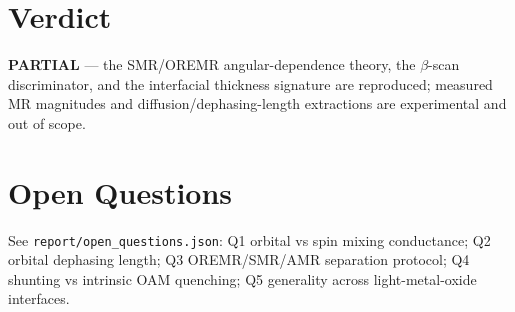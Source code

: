 \documentclass[11pt]{article}
\begin{document}
\section{Verdict}
\textbf{PARTIAL} --- the SMR/OREMR angular-dependence theory, the $\beta$-scan discriminator, and the
interfacial thickness signature are reproduced; measured MR magnitudes and diffusion/dephasing-length
extractions are experimental and out of scope.

\section*{Open Questions}
See \texttt{report/open\_questions.json}: Q1 orbital vs spin mixing conductance; Q2 orbital dephasing
length; Q3 OREMR/SMR/AMR separation protocol; Q4 shunting vs intrinsic OAM quenching; Q5 generality
across light-metal-oxide interfaces.
\end{document}

